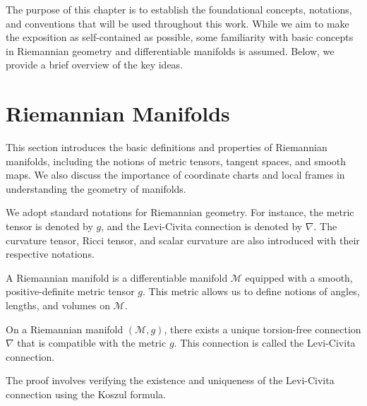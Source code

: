 \PlaceText{69mm}{79mm}{ \color{gal}\noindent\makebox[\linewidth]{\rule{2\paperwidth}{1pt}}}

\color{black}
The purpose of this chapter is to establish the foundational concepts, notations, and conventions that will be used throughout this work. While we aim to make the exposition as self-contained as possible, some familiarity with basic concepts in Riemannian geometry and differentiable manifolds is assumed. Below, we provide a brief overview of the key ideas.

\section{Riemannian Manifolds}
\PlaceText{15mm}{13mm}{ \color{white}\noindent\makebox[\linewidth]{\rule{2\paperwidth}{10pt}}}
\vspace{-1.5cm}
\begin{oobs}
This section introduces the basic definitions and properties of Riemannian manifolds, including the notions of metric tensors, tangent spaces, and smooth maps. We also discuss the importance of coordinate charts and local frames in understanding the geometry of manifolds.
\end{oobs}

\begin{oobs}
We adopt standard notations for Riemannian geometry. For instance, the metric tensor is denoted by \( g \), and the Levi-Civita connection is denoted by \( \nabla \). The curvature tensor, Ricci tensor, and scalar curvature are also introduced with their respective notations.
\end{oobs}

\begin{deff}
A Riemannian manifold is a differentiable manifold \( \mathcal{M} \) equipped with a smooth, positive-definite metric tensor \( g \). This metric allows us to define notions of angles, lengths, and volumes on \( \mathcal{M} \).
\end{deff}

\begin{teorema}
On a Riemannian manifold \( (\mathcal{M}, g) \), there exists a unique torsion-free connection \( \nabla \) that is compatible with the metric \( g \). This connection is called the Levi-Civita connection.
\end{teorema}

\begin{demm}
The proof involves verifying the existence and uniqueness of the Levi-Civita connection using the Koszul formula.
\end{demm}


